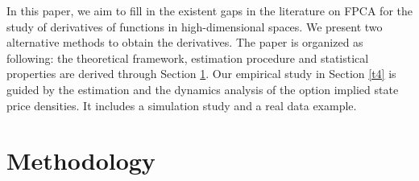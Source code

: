 In this paper, we aim to fill in the existent gaps in the literature on FPCA for the study of derivatives of functions in high-dimensional spaces. We present two alternative methods to obtain the derivatives. %
The paper is organized as following: the theoretical framework, estimation procedure and statistical properties are derived through Section \ref{t2}. Our empirical study in Section \ref{t4} is guided by the estimation and the dynamics analysis of the option implied state price densities. It includes a simulation study and a real data example. %



\section{Methodology}\label{t2}



